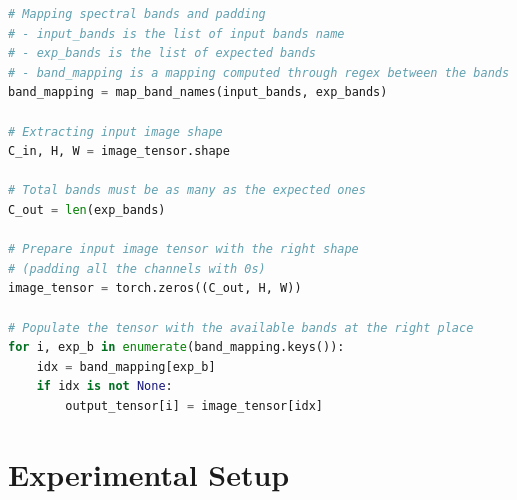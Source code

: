 \documentclass[a4paper, twoside, english]{sapthesis} %
\begin{document}
\vspace{0.5cm}

\begin{lstlisting}[language=Python, caption={Pseudocode for reordering the multispectral bands of input images and padding with zeroes the missing ones.}, label={lst:bandmapping}]
# Mapping spectral bands and padding
# - input_bands is the list of input bands name
# - exp_bands is the list of expected bands
# - band_mapping is a mapping computed through regex between the bands sets,
band_mapping = map_band_names(input_bands, exp_bands)

# Extracting input image shape
C_in, H, W = image_tensor.shape

# Total bands must be as many as the expected ones
C_out = len(exp_bands)

# Prepare input image tensor with the right shape
# (padding all the channels with 0s)
image_tensor = torch.zeros((C_out, H, W))

# Populate the tensor with the available bands at the right place
for i, exp_b in enumerate(band_mapping.keys()):
    idx = band_mapping[exp_b]
    if idx is not None:
        output_tensor[i] = image_tensor[idx]
\end{lstlisting}



\chapter{Experimental Setup} %
\end{document}
